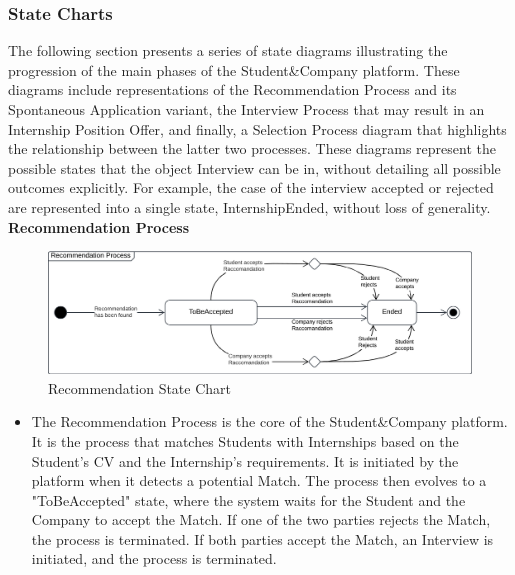 \subsubsection{State Charts}
The following section presents a series of state diagrams illustrating the progression of the main phases of the Student\&Company platform. These diagrams include representations of the Recommendation Process and its Spontaneous Application variant, the Interview Process that may result in an Internship Position Offer, and finally, a Selection Process diagram that highlights the relationship between the latter two processes.
These diagrams represent the possible states that the object Interview can be in, without detailing all possible outcomes explicitly. For example, the case of the interview accepted or rejected are represented into a single state, InternshipEnded, without loss of generality.
\newline\newline
\noindent\textbf{\color{titleColor}Recommendation Process}\\
\begin{figure}[ht]
    \centering
    \includegraphics[width=1 \textwidth]{Latex/Images/RecommendationStateChart.png}
    \caption{Recommendation State Chart}
    \label{fig:RecommendationProcess}
\end{figure}
\begin{itemize}
    \item The Recommendation Process is the core of the Student\&Company platform. It is the process that matches Students with Internships based on the Student's CV and the Internship's requirements. It is initiated by the platform when it detects a potential Match. The process then evolves to a "ToBeAccepted" state, where the system waits for the Student and the Company to accept the Match. If one of the two parties rejects the Match, the process is terminated. If both parties accept the Match, an Interview is initiated, and the process is terminated.
\end{itemize}

